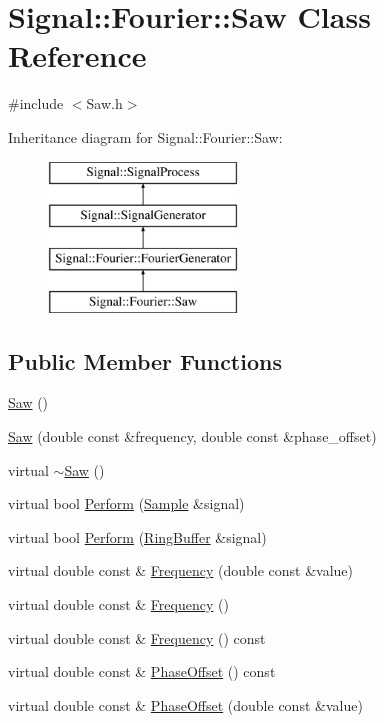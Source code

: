 \hypertarget{classSignal_1_1Fourier_1_1Saw}{\section{Signal\+:\+:Fourier\+:\+:Saw Class Reference}
\label{classSignal_1_1Fourier_1_1Saw}
}


{\ttfamily \#include $<$Saw.\+h$>$}

Inheritance diagram for Signal\+:\+:Fourier\+:\+:Saw\+:\begin{figure}[H]
\begin{center}
\leavevmode
\includegraphics[height=4.000000cm]{classSignal_1_1Fourier_1_1Saw}
\end{center}
\end{figure}
\subsection*{Public Member Functions}
\begin{DoxyCompactItemize}
\item 
\hyperlink{classSignal_1_1Fourier_1_1Saw_ae91605981e8c08c9e65eefb7d9d5b13f}{Saw} ()
\item 
\hyperlink{classSignal_1_1Fourier_1_1Saw_aab83de6d87180afbd96416ae3ccd524d}{Saw} (double const \&frequency, double const \&phase\+\_\+offset)
\item 
virtual \hyperlink{classSignal_1_1Fourier_1_1Saw_aa5529baeec45ec08ee038f761e18a263}{$\sim$\+Saw} ()
\item 
virtual bool \hyperlink{classSignal_1_1Fourier_1_1Saw_adf69eea95516fc9c7d06fae036d2fa9b}{Perform} (\hyperlink{classSignal_1_1Sample}{Sample} \&signal)
\item 
virtual bool \hyperlink{classSignal_1_1Fourier_1_1Saw_acef099db2217902d7157e5b93f658363}{Perform} (\hyperlink{classSignal_1_1RingBuffer}{Ring\+Buffer} \&signal)
\item 
virtual double const \& \hyperlink{classSignal_1_1Fourier_1_1Saw_a398a26142f42cdc5cb33230e9ab05b9d}{Frequency} (double const \&value)
\item 
virtual double const \& \hyperlink{classSignal_1_1Fourier_1_1Saw_ac043dbd87268aae7e203ab0d67bbdb5c}{Frequency} ()
\item 
virtual double const \& \hyperlink{classSignal_1_1SignalGenerator_a96af42ee68f94e9b04d034fd68b73ecd}{Frequency} () const 
\item 
virtual double const \& \hyperlink{classSignal_1_1SignalGenerator_ac2538ec946f001e394d2416fda698d1c}{Phase\+Offset} () const 
\item 
virtual double const \& \hyperlink{classSignal_1_1SignalGenerator_ac6a103ff72beaa338f6d18c812522d78}{Phase\+Offset} (double const \&value)
\end{DoxyCompactItemize}
